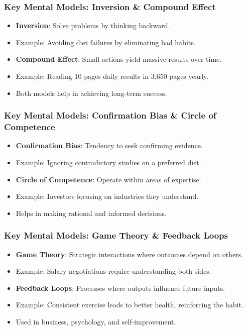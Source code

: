 \begin{frame}[fragile]\frametitle{Key Mental Models: Inversion & Compound Effect}
    \begin{itemize}
        \item \textbf{Inversion}: Solve problems by thinking backward.
        \item Example: Avoiding diet failures by eliminating bad habits.
        \item \textbf{Compound Effect}: Small actions yield massive results over time.
        \item Example: Reading 10 pages daily results in 3,650 pages yearly.
        \item Both models help in achieving long-term success.
    \end{itemize}
\end{frame}

\begin{frame}[fragile]\frametitle{Key Mental Models: Confirmation Bias & Circle of Competence}
    \begin{itemize}
        \item \textbf{Confirmation Bias}: Tendency to seek confirming evidence.
        \item Example: Ignoring contradictory studies on a preferred diet.
        \item \textbf{Circle of Competence}: Operate within areas of expertise.
        \item Example: Investors focusing on industries they understand.
        \item Helps in making rational and informed decisions.
    \end{itemize}
\end{frame}

\begin{frame}[fragile]\frametitle{Key Mental Models: Game Theory & Feedback Loops}
    \begin{itemize}
        \item \textbf{Game Theory}: Strategic interactions where outcomes depend on others.
        \item Example: Salary negotiations require understanding both sides.
        \item \textbf{Feedback Loops}: Processes where outputs influence future inputs.
        \item Example: Consistent exercise leads to better health, reinforcing the habit.
        \item Used in business, psychology, and self-improvement.
    \end{itemize}
\end{frame}

